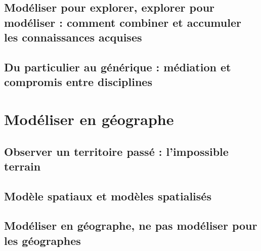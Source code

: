 \subsection{Modéliser pour explorer, explorer pour modéliser : comment combiner et accumuler les connaissances acquises}
\subsection{Du particulier au générique : médiation et compromis entre disciplines}

\section{Modéliser en géographe}
\subsection{Observer un territoire passé : l'impossible terrain}
\subsection{Modèle spatiaux et modèles spatialisés}
\subsection{Modéliser en géographe, ne pas modéliser pour les géographes}
